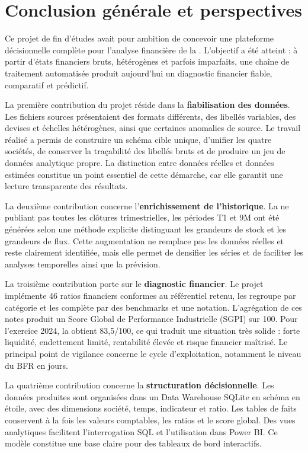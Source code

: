 \chapter*{Conclusion générale et perspectives}

Ce projet de fin d'études avait pour ambition de concevoir une plateforme
décisionnelle complète pour l'analyse financière de la \sfbt. L'objectif a été
atteint : à partir d'états financiers bruts, hétérogènes et parfois imparfaits,
une chaîne de traitement automatisée produit aujourd'hui un diagnostic financier
fiable, comparatif et prédictif.

\medskip
La première contribution du projet réside dans la \textbf{fiabilisation des
données}. Les fichiers sources présentaient des formats différents, des libellés
variables, des devises et échelles hétérogènes, ainsi que certaines anomalies de
source. Le travail réalisé a permis de construire un schéma cible unique,
d'unifier les quatre sociétés, de conserver la traçabilité des libellés bruts et
de produire un jeu de données analytique propre. La distinction entre données
réelles et données estimées constitue un point essentiel de cette démarche, car
elle garantit une lecture transparente des résultats.

\medskip
La deuxième contribution concerne l'\textbf{enrichissement de l'historique}. La
\sfbt ne publiant pas toutes les clôtures trimestrielles, les périodes T1 et 9M
ont été générées selon une méthode explicite distinguant les grandeurs de stock
et les grandeurs de flux. Cette augmentation ne remplace pas les données réelles
et reste clairement identifiée, mais elle permet de densifier les séries et de
faciliter les analyses temporelles ainsi que la prévision.

\medskip
La troisième contribution porte sur le \textbf{diagnostic financier}. Le projet
implémente 46 ratios financiers conformes au référentiel retenu, les regroupe par
catégorie et les complète par des benchmarks et une notation. L'agrégation de ces
notes produit un Score Global de Performance Industrielle (SGPI) sur 100. Pour
l'exercice 2024, la \sfbt obtient 83,5/100, ce qui traduit une situation très
solide : forte liquidité, endettement limité, rentabilité élevée et risque
financier maîtrisé. Le principal point de vigilance concerne le cycle
d'exploitation, notamment le niveau du BFR en jours.

\medskip
La quatrième contribution concerne la \textbf{structuration décisionnelle}. Les
données produites sont organisées dans un Data Warehouse SQLite en schéma en
étoile, avec des dimensions société, temps, indicateur et ratio. Les tables de
faits conservent à la fois les valeurs comptables, les ratios et le score global.
Des vues analytiques facilitent l'interrogation SQL et l'utilisation dans Power
BI. Ce modèle constitue une base claire pour des tableaux de bord interactifs.

